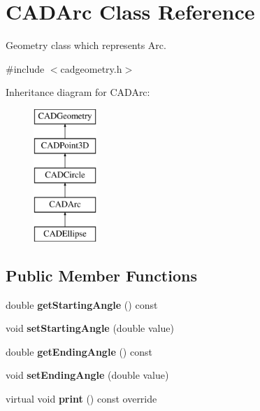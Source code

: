 \hypertarget{class_c_a_d_arc}{}\section{C\+A\+D\+Arc Class Reference}
\label{class_c_a_d_arc}


Geometry class which represents Arc.  




{\ttfamily \#include $<$cadgeometry.\+h$>$}

Inheritance diagram for C\+A\+D\+Arc\+:\begin{figure}[H]
\begin{center}
\leavevmode
\includegraphics[height=5.000000cm]{class_c_a_d_arc}
\end{center}
\end{figure}
\subsection*{Public Member Functions}
\begin{DoxyCompactItemize}
\item 
double {\bfseries get\+Starting\+Angle} () const \hypertarget{class_c_a_d_arc_a0277ad66f5be5a42657e79c5fc185ffa}{}\label{class_c_a_d_arc_a0277ad66f5be5a42657e79c5fc185ffa}

\item 
void {\bfseries set\+Starting\+Angle} (double value)\hypertarget{class_c_a_d_arc_a5a6c9ca1a413b3c8429a860e05b279e9}{}\label{class_c_a_d_arc_a5a6c9ca1a413b3c8429a860e05b279e9}

\item 
double {\bfseries get\+Ending\+Angle} () const \hypertarget{class_c_a_d_arc_a0e11365230e1aef90a998e0bca6ddc3e}{}\label{class_c_a_d_arc_a0e11365230e1aef90a998e0bca6ddc3e}

\item 
void {\bfseries set\+Ending\+Angle} (double value)\hypertarget{class_c_a_d_arc_abcb9d76ef0df5c1ebe891ca8b38f1576}{}\label{class_c_a_d_arc_abcb9d76ef0df5c1ebe891ca8b38f1576}

\item 
virtual void {\bfseries print} () const  override\hypertarget{class_c_a_d_arc_a0227ac419a5e1412c3daa65bd90f640f}{}\label{class_c_a_d_arc_a0227ac419a5e1412c3daa65bd90f640f}

\end{DoxyCompactItemize}
